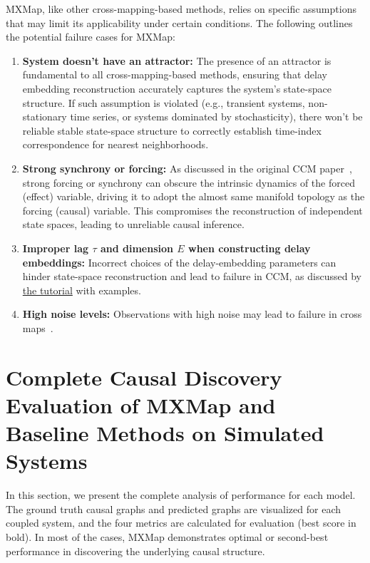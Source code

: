 MXMap, like other cross-mapping-based methods, relies on specific assumptions that may limit its applicability under certain conditions. The following outlines the potential failure cases for MXMap:

\begin{enumerate}
    \item \textbf{System doesn't have an attractor:} The presence of an attractor is fundamental to all cross-mapping-based methods, ensuring that delay embedding reconstruction accurately captures the system’s state-space structure. If such assumption is violated (e.g.,  transient systems, non-stationary time series, or systems dominated by stochasticity), there won't be reliable stable state-space structure to correctly establish time-index correspondence for nearest neighborhoods.
    \item \textbf{Strong synchrony or forcing:} As discussed in the original CCM paper~\citep{sugihara2012detecting}, strong forcing or synchrony can obscure the intrinsic dynamics of the forced (effect) variable, driving it to adopt the almost same manifold topology as the forcing (causal) variable. This compromises the reconstruction of independent state spaces, leading to unreliable causal inference.
    \item \textbf{Improper lag $\tau$ and dimension $E$ when constructing delay embeddings:} Incorrect choices of the delay-embedding parameters can hinder state-space reconstruction and lead to failure in CCM, as discussed by \href{https://www.youtube.com/watch?v=lKj4hr_2-Vg}{the tutorial} with examples.
    \item \textbf{High noise levels:} Observations with high noise may lead to failure in cross maps~\citep{monster2017causal}.
\end{enumerate}





\section{Complete Causal Discovery Evaluation of MXMap and Baseline Methods on Simulated Systems}
\label{appsec:complet}

In this section, we present the complete analysis of performance for each model. The ground truth causal graphs and predicted graphs are visualized for each coupled system, and the four metrics are calculated for evaluation (best score in bold). In most of the cases, MXMap demonstrates optimal or second-best performance in discovering the underlying causal structure.

